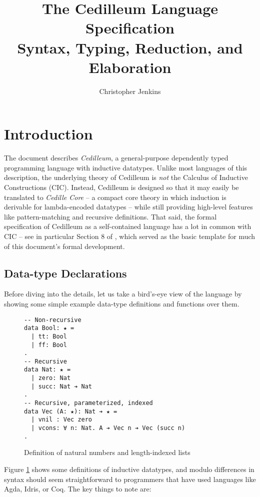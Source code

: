 \documentclass{article}
\begin{document}
\title{The Cedilleum Language Specification \\ \large Syntax, Typing, Reduction,
  and Elaboration }

\author{Christopher Jenkins}

\maketitle

\section{Introduction}
\label{sec:intro}
The document describes \textit{Cedilleum}, a general-purpose dependently typed
programming language with inductive datatypes. Unlike most languages of this
description, the underlying theory of Cedilleum is \textit{not} the Calculus of
Inductive Constructions (CIC)\cite{Pa15_Intro-CIC}. Instead, Cedilleum is
designed so that it may easily be translated to \textit{Cedille Core} -- a
compact core theory in which induction is derivable for lambda-encoded datatypes
-- while still providing high-level features like pattern-matching and recursive
definitions. That said, the formal specification of Cedilleum as a
self-contained language has a lot in common with CIC -- see in particular
Section 8 of \cite{In18_Coq-Docs}, which served as the basic template for much
of this document's formal development.

\subsection{Data-type Declarations}
Before diving into the details, let us take a bird's-eye view of the language
by showing some simple example data-type definitions and functions over them.

\begin{figure}[h]
\begin{verbatim}
-- Non-recursive
data Bool: ★ =
  | tt: Bool
  | ff: Bool
.
-- Recursive
data Nat: ★ = 
  | zero: Nat
  | succ: Nat ➔ Nat
.
-- Recursive, parameterized, indexed
data Vec (A: ★): Nat ➔ ★ =
  | vnil : Vec zero
  | vcons: ∀ n: Nat. A ➔ Vec n ➔ Vec (succ n)
.
\end{verbatim}
  \caption{Definition of natural numbers and length-indexed lists}
  \label{fig:ex-data-decl}
\end{figure}
Figure \ref{fig:ex-data-decl} shows some definitions of inductive datatypes, and
modulo differences in syntax should seem straightforward to programmers that
have used languages like Agda, Idris, or Coq. The key things to note are:
\end{document}
